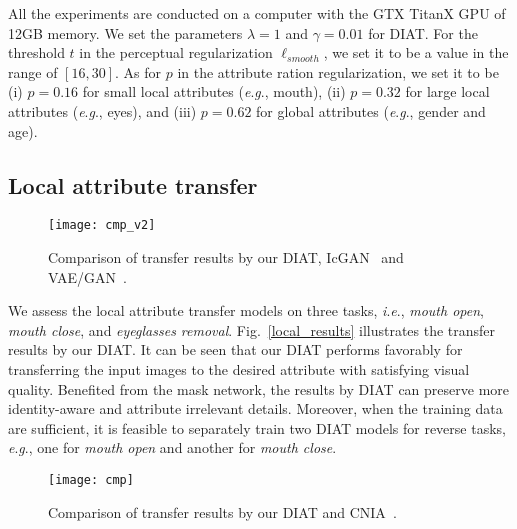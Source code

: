 \documentclass[journal]{IEEEtran}
\newcommand{\ie}{\textit{i}.\textit{e}.}
\newcommand{\eg}{\textit{e}.\textit{g}.}
\begin{document}
All the experiments are conducted on a computer with the GTX TitanX GPU of 12GB memory.
We set the parameters $\lambda=1$ and $\gamma=0.01$ for DIAT.
For the threshold $t$ in the perceptual regularization $\ell_{smooth}$, we set it to be a value in the range of $[16, 30]$.
As for $p$ in the attribute ration regularization, we set it to be (i) $p=0.16$ for small local attributes (\eg, mouth), (ii) $p=0.32$ for large local attributes (\eg, eyes), and (iii) $p=0.62$ for global attributes (\eg, gender and age).




\subsection{Local attribute transfer}
\begin{figure*}
\begin{center}
\texttt{[image: cmp\_v2]}
\end{center}
   \caption{Comparison of transfer results by our DIAT, IcGAN~\cite{Perarnau2016} and VAE/GAN~\cite{larsen2015autoencoding}.}
\label{cmp_v2}
\end{figure*}

We assess the local attribute transfer models on three tasks, \ie, \emph{mouth open}, \emph{mouth close}, and \emph{eyeglasses removal}.
Fig.~\ref{local_results} illustrates the transfer results by our DIAT.
It can be seen that our DIAT performs favorably for transferring the input images to the desired attribute with satisfying visual quality.
Benefited from the mask network, the results by DIAT can preserve more identity-aware and attribute irrelevant details.
Moreover, when the training data are sufficient, it is feasible to separately train two DIAT models for reverse tasks, \eg, one for \emph{mouth open} and another for \emph{mouth close}.


\begin{figure*}
\begin{center}
\texttt{[image: cmp]}
\end{center}
   \caption{Comparison of transfer results by our DIAT and CNIA~\cite{li2016convolutional}.}
\label{cmp}
\end{figure*}
\end{document}
